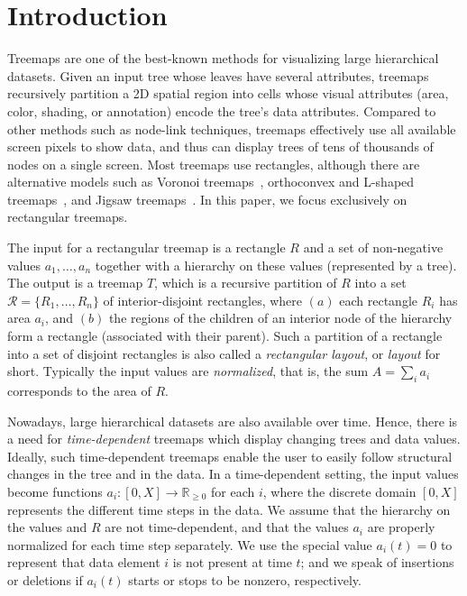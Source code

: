 \section{Introduction}
\label{sec:introduction}

Treemaps are one of the best-known methods for visualizing large hierarchical datasets. Given an input tree whose leaves have several attributes, treemaps recursively partition a 2D spatial region into cells whose visual attributes (area, color, shading, or annotation) encode the tree's data attributes. Compared to other methods such as node-link techniques, treemaps effectively use all available screen pixels to show data, and thus can display trees of tens of thousands of nodes on a single screen. Most treemaps use rectangles, although there are alternative models such as Voronoi treemaps~\citep{balzer05b}, orthoconvex and L-shaped treemaps~\citep{deberg14}, and Jigsaw treemaps~\citep{jigsaw}. 
In this paper, we focus exclusively on rectangular treemaps.

The input for a rectangular treemap is a rectangle $R$ and a set of non-negative values $a_1, \ldots, a_n$ together with a hierarchy on these values (represented by a tree). The output is a treemap $T$, which is a recursive partition of $R$ into a set $\mathcal{R}=\{R_1, \ldots, R_n \}$ of interior-disjoint rectangles, where $(a)$ each rectangle $R_i$ has area $a_i$, and $(b)$ the regions of the children of an interior node of the hierarchy form a rectangle (associated with their parent). Such a partition of a rectangle into a set of disjoint rectangles is also called a \emph{rectangular layout}, or \emph{layout} for short. Typically the input values are \emph{normalized}, that is, the sum $A = \sum_i a_i$ corresponds to the area of $R$.

Nowadays, large hierarchical datasets are also available over time. Hence, there is a need for \emph{time-dependent} treemaps which display changing trees and data values. Ideally, such time-dependent treemaps enable the user to easily follow structural changes in the tree and in the data. In a time-dependent setting, the input values become functions $a_i\colon [0, X] \rightarrow \mathbb{R}_{\geq 0}$ for each $i$, where the discrete domain $[0, X]$ represents the different time steps in the data. We assume that the hierarchy on the values and $R$ are not time-dependent, and that the values $a_i$ are properly normalized for each time step separately. We use the special value $a_i(t) = 0$ to represent that data element $i$ is not present at time $t$; and we speak of insertions or deletions if $a_i(t)$ starts or stops to be nonzero, respectively.

